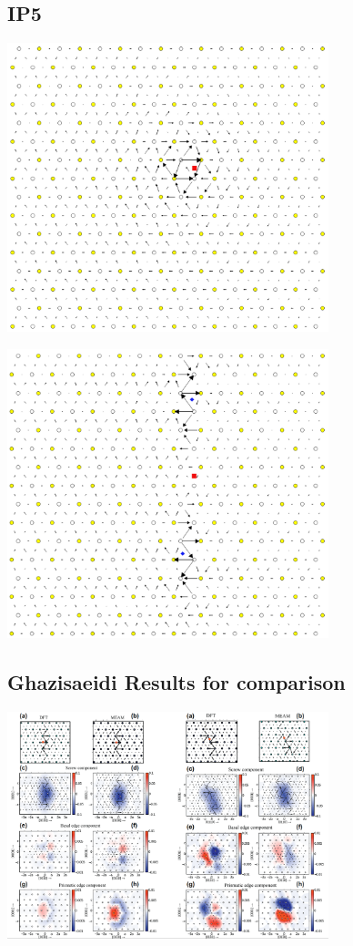 \documentclass[11pt]{article}
\begin{document}
\subsection{IP5}
\label{sec:org41c089e}
\begin{center}
\includegraphics[width=0.7\textwidth]{Images/final_model_IP5_partial_dd_initial.png}
\end{center}
\begin{center}
\includegraphics[width=0.7\textwidth]{Images/final_model_IP5_partial_dd_final.png}
\end{center}

\subsection{Ghazisaeidi Results for comparison}
\label{sec:orgaabb55e}

\begin{center}
\includegraphics[width=0.7\textwidth]{Images/ghazisaiedi-trinkle-scew-dislocation-core-prism-symm-asymm.png}
\end{center}
\end{document}
